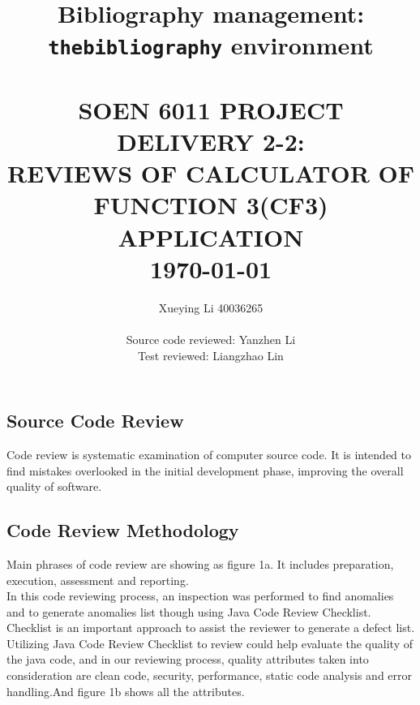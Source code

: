 \documentclass[15pt]{article}
\title{Bibliography management:\\\texttt{thebibliography} environment}
\begin{document}
\begin{CJK*}{UTF8}{gbsn}
{\selectfont
\title{ \normalsize \textsc{}
		\\ [2.0cm]
		\LARGE \textbf{\uppercase{
		\\
		SOEN 6011 PROJECT DELIVERY 2-2:\\ REVIEWS of CALCULATOR of FUNCTION 3(CF3) APPLICATION\\}
		\normalsize \today \vspace*{5\baselineskip}}
		}
\date{}

\author{
		Xueying Li 40036265\\ 
		\href{https://github.com/raphealshirley/SOEN6011-PROJECT}\\
	Source code reviewed: Yanzhen Li\\
	Test reviewed: Liangzhao Lin\\
		}
	

\maketitle
\newpage

\section{Source Code Review}
Code review is systematic examination of computer source code. It is intended to find mistakes overlooked in the initial development phase, improving the overall quality of software\cite{1}.


\subsection{Code Review Methodology}
Main phrases of code review are showing as figure 1a. It includes preparation, execution, assessment and reporting.\\
In this code reviewing process, an inspection was performed to find anomalies and to generate anomalies list though using Java Code Review Checklist\cite{2}.\\
Checklist is an important approach to assist the reviewer to generate a defect list. Utilizing Java Code Review Checklist to review could help evaluate the quality of the java code, and in our reviewing process, quality attributes taken into consideration are clean code, security, performance, static code analysis and error handling.And figure 1b shows all the attributes.

}
\end{CJK*}
\end{document}
